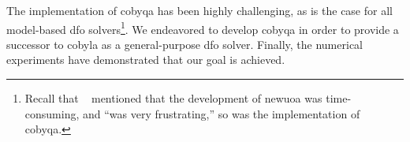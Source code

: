 The implementation of \gls{cobyqa} has been highly challenging, as is the case for all model-based \gls{dfo} solvers\footnote{Recall that \citeauthor{Powell_2006}~\cite{Powell_2006} mentioned that the development of \gls{newuoa} was time-consuming, and \enquote{was very frustrating,} so was the implementation of \gls{cobyqa}.}.
We endeavored to develop \gls{cobyqa} in order to provide a successor to \gls{cobyla} as a general-purpose \gls{dfo} solver.
Finally, the numerical experiments have demonstrated that our goal is achieved.
